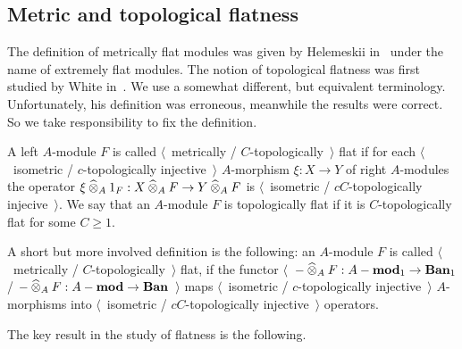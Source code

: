 
\subsection{
    Metric and topological flatness
}\label{SubSectionMetricAndTopologicalFlatness}

The definition of metrically flat modules was given by Helemeskii 
in~\cite{HelMetrFlatNorMod} under the name of extremely flat modules. The 
notion of topological flatness was first studied by 
White in~\cite{WhiteInjmoduAlg}. We use a somewhat different, but equivalent  
terminology. Unfortunately, his definition was erroneous, meanwhile the results 
were correct. So we take responsibility to fix the definition.

\begin{definition}\label{MetCTopFlatMod} 
A left $A$-module $F$ is 
called $\langle$~metrically / $C$-topologically~$\rangle$ 
flat if for each $\langle$~isometric / $c$-topologically injective~$\rangle$ 
$A$-morphism $\xi:X\to Y$ of right $A$-modules the 
operator $\xi\mathbin{\widehat{\otimes}}_{A} 1_F:X\mathbin{\widehat{\otimes}}_{A} F\to Y\mathbin{\widehat{\otimes}}_{A} F$ 
is $\langle$~isometric / $c C$-topologically injecive~$\rangle$. We say that an 
$A$-module $F$ is topologically flat if it is $C$-topologically flat for 
some $C\geq 1$.
\end{definition}

A short but more involved definition is the following: an $A$-module $F$ is
called $\langle$~metrically / $C$-topologically~$\rangle$ flat, if the functor
$\langle$~$-\mathbin{\widehat{\otimes}}_{A}F:A-\mathbf{mod}_1\to\mathbf{Ban}_1$ /
$-\mathbin{\widehat{\otimes}}_{A}F:A-\mathbf{mod}\to\mathbf{Ban}$~$\rangle$ maps
$\langle$~isometric / $c$-topologically injective~$\rangle$ $A$-morphisms into
$\langle$~isometric / $c C$-topologically injective~$\rangle$ operators.

The key result in the study of flatness is the following.

